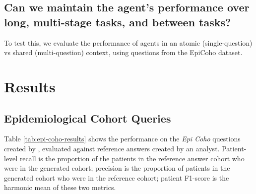 \documentclass[11pt]{article}
\begin{document}
\subsection*{Can we maintain the agent's performance over long, multi-stage tasks, and between tasks?}

To test this, we evaluate the performance of agents in an atomic (single-question) vs shared (multi-question) context, using questions from the EpiCoho
dataset.


\section{Results}

\subsection{Epidemiological Cohort Queries}

Table \ref{tab:epi-coho-results} shows the performance on the \textit{Epi Coho} questions created by \citet{ziletti_generating_2025}, evaluated against reference answers created by an analyst.
Patient-level recall is the proportion of the patients in the reference answer cohort who were in the generated cohort; precision is the proportion of patients in the generated cohort who were in the reference cohort; patient F1-score is the harmonic mean of these two metrics.
\end{document}
